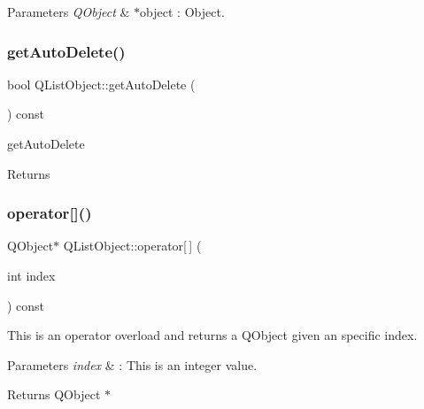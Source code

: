 \begin{DoxyParams}{Parameters}
{\em Q\+Object} & $\ast$object \+: Object. \\
\hline
\end{DoxyParams}
\mbox{\label{class_q_list_object_ad9d1f7e3c9f2563bcded31b02edc06fb}} 
\subsubsection{\texorpdfstring{get\+Auto\+Delete()}{getAutoDelete()}}
{\footnotesize\ttfamily bool Q\+List\+Object\+::get\+Auto\+Delete (\begin{DoxyParamCaption}{ }\end{DoxyParamCaption}) const\hspace{0.3cm}{\ttfamily [inline]}}



get\+Auto\+Delete 

\begin{DoxyReturn}{Returns}

\end{DoxyReturn}
\mbox{\label{class_q_list_object_a9b87308d291c9699a36849e5d8bfedd4}} 
\subsubsection{\texorpdfstring{operator[]()}{operator[]()}}
{\footnotesize\ttfamily Q\+Object$\ast$ Q\+List\+Object\+::operator\mbox{[}$\,$\mbox{]} (\begin{DoxyParamCaption}\item[{int}]{index }\end{DoxyParamCaption}) const\hspace{0.3cm}{\ttfamily [inline]}}



This is an operator overload and returns a Q\+Object given an specific index. 


\begin{DoxyParams}{Parameters}
{\em index} & \+: This is an integer value. \\
\hline
\end{DoxyParams}
\begin{DoxyReturn}{Returns}
Q\+Object $\ast$ 
\end{DoxyReturn}
\mbox{\label{class_q_list_object_af6bc1883142f976bfd3e82c9d0c030bb}} 

